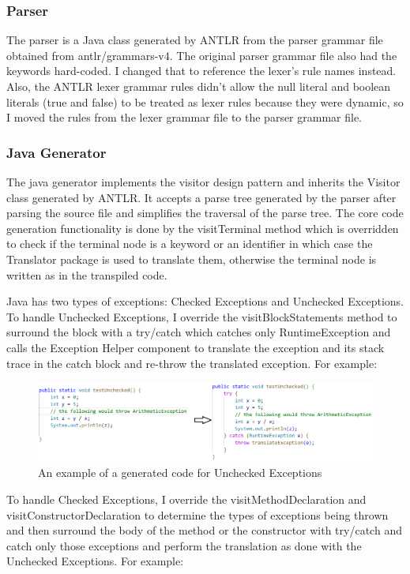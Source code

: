 \subsubsection{Parser}
The parser is a Java class generated by ANTLR from the parser grammar file obtained from antlr/grammars-v4. The original parser grammar file also had the keywords hard-coded. I changed that to reference the lexer's rule names instead. 
Also, the ANTLR lexer grammar rules didn't allow the null literal and boolean literals (true and false) to be treated as lexer rules because they were dynamic, so I moved the rules from the lexer grammar file to the parser grammar file. 

\subsubsection{Java Generator}
The java generator implements the visitor design pattern and inherits the Visitor class generated by ANTLR. It accepts a parse tree generated by the parser after parsing the source file and simplifies the traversal of the parse tree. The core code generation functionality is done by the visitTerminal method which is overridden to check if the terminal node is a keyword or an identifier in which case the Translator package is used to translate them, otherwise the terminal node is written as in the transpiled code. 

Java has two types of exceptions: Checked Exceptions and Unchecked Exceptions. To handle Unchecked Exceptions, I override the visitBlockStatements method to surround the block with a try/catch which catches only RuntimeException and calls the Exception Helper component to translate the exception and its stack trace in the catch block and re-throw the translated exception. For example: 

\begin{figure}[H]
\centering
\includegraphics[width=15cm]{ch3-images/unchecked.png}
\caption{An example of a generated code for Unchecked Exceptions}
\label{fig:An example of a generated code for Unchecked Exceptions}
\end{figure} 

To handle Checked Exceptions, I override the visitMethodDeclaration and visitConstructorDeclaration to determine the types of exceptions being thrown and then surround the body of the method or the constructor with try/catch and catch only those exceptions and perform the translation as done with the Unchecked Exceptions. For example:

